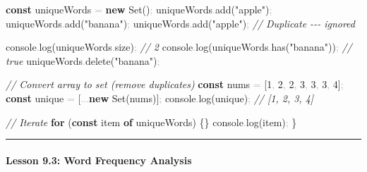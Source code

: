 \documentclass[
  justified,
  openright,
]{tufte-book}
\let\subsection\paragraph
\let\paragraph\paragraph
\newcommand{\KeywordTok}[1]{\textcolor{CodeKeyword}{\textbf{#1}}}  %
\newcommand{\StringTok}[1]{\textcolor{CodeString}{#1}}              %
\newcommand{\CommentTok}[1]{\textcolor{CodeComment}{\textit{#1}}}  %
\newcommand{\CodeNumTok}[1]{\textcolor{CodeNumber}{#1}}             %
\newcommand{\CodeFuncTok}[1]{\textcolor{CodeKeyword}{#1}}           %
\newcommand{\CodeTypeTok}[1]{\textcolor{CodeType}{#1}}              %
\newcommand{\OperatorTok}[1]{\textcolor{DarkGray}{#1}}              %
\newenvironment{Shaded}{%
  \begin{mdframed}[style=TufteCode]%
}{%
  \end{mdframed}%
}
\let\subsection\paragraph
\let\paragraph\paragraph
\begin{document}
\begin{Shaded}
\begin{Highlighting}[]
\KeywordTok{const} uniqueWords \OperatorTok{=} \KeywordTok{new} Set()\OperatorTok{;}
uniqueWords\OperatorTok{.}\CodeFuncTok{add}(\StringTok{"apple"})\OperatorTok{;}
uniqueWords\OperatorTok{.}\CodeFuncTok{add}(\StringTok{"banana"})\OperatorTok{;}
uniqueWords\OperatorTok{.}\CodeFuncTok{add}(\StringTok{"apple"})\OperatorTok{;} \CommentTok{// Duplicate {-}{-}{-} ignored}
 
console\OperatorTok{.}\CodeFuncTok{log}(uniqueWords\OperatorTok{.}\CodeTypeTok{size})\OperatorTok{;} \CommentTok{// 2}
console\OperatorTok{.}\CodeFuncTok{log}(uniqueWords\OperatorTok{.}\CodeFuncTok{has}(\StringTok{"banana"}))\OperatorTok{;} \CommentTok{// true}
uniqueWords\OperatorTok{.}\CodeFuncTok{delete}(\StringTok{"banana"})\OperatorTok{;}
 
\CommentTok{// Convert array to set (remove duplicates)}
\KeywordTok{const} nums \OperatorTok{=} [\CodeNumTok{1}\OperatorTok{,} \CodeNumTok{2}\OperatorTok{,} \CodeNumTok{2}\OperatorTok{,} \CodeNumTok{3}\OperatorTok{,} \CodeNumTok{3}\OperatorTok{,} \CodeNumTok{3}\OperatorTok{,} \CodeNumTok{4}]\OperatorTok{;}
\KeywordTok{const} unique \OperatorTok{=} [\OperatorTok{...}\KeywordTok{new} Set(nums)]\OperatorTok{;}
console\OperatorTok{.}\CodeFuncTok{log}(unique)\OperatorTok{;} \CommentTok{// [1, 2, 3, 4]}
 
\CommentTok{// Iterate}
\KeywordTok{for} (\KeywordTok{const} item \KeywordTok{of} uniqueWords) \{\}
  console\OperatorTok{.}\CodeFuncTok{log}(item)\OperatorTok{;}
\}
\end{Highlighting}
\end{Shaded}

\begin{center}\rule{0.5\linewidth}{0.5pt}\end{center}

\subsection{Lesson 9.3: Word Frequency
Analysis}\label{lesson-9.3-word-frequency-analysis}
\end{document}
